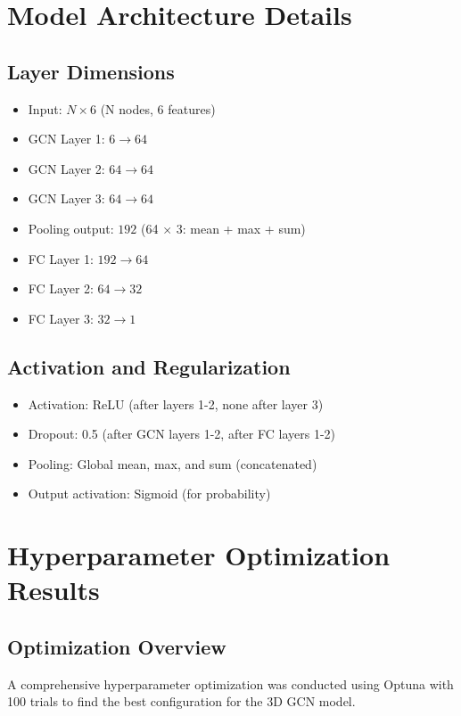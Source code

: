 \documentclass[11pt,a4paper]{article}
\begin{document}
\section{Model Architecture Details}

\subsection{Layer Dimensions}
\begin{itemize}
    \item Input: $N \times 6$ (N nodes, 6 features)
    \item GCN Layer 1: $6 \to 64$
    \item GCN Layer 2: $64 \to 64$
    \item GCN Layer 3: $64 \to 64$
    \item Pooling output: $192$ (64 $\times$ 3: mean + max + sum)
    \item FC Layer 1: $192 \to 64$
    \item FC Layer 2: $64 \to 32$
    \item FC Layer 3: $32 \to 1$
\end{itemize}

\subsection{Activation and Regularization}
\begin{itemize}
    \item Activation: ReLU (after layers 1-2, none after layer 3)
    \item Dropout: 0.5 (after GCN layers 1-2, after FC layers 1-2)
    \item Pooling: Global mean, max, and sum (concatenated)
    \item Output activation: Sigmoid (for probability)
\end{itemize}

\section{Hyperparameter Optimization Results}

\subsection{Optimization Overview}

A comprehensive hyperparameter optimization was conducted using Optuna with 100 trials to find the best configuration for the 3D GCN model.
\end{document}
